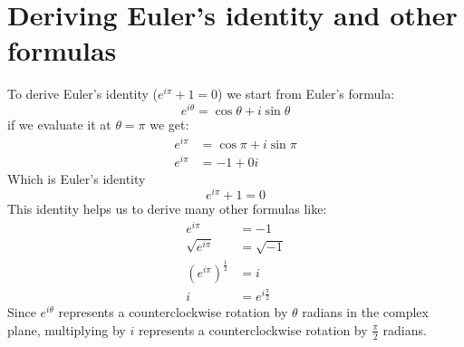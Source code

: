 \documentclass[12pt,a4paper]{article}
\begin{document}
\section{Deriving Euler's identity and other formulas}\label{app:AppendixC}
To derive Euler's identity ($e^{i\pi} + 1 = 0$) we start from Euler's formula:
\[
e^{i\theta} = \cos{\theta} + i\sin{\theta}
\]
if we evaluate it at $\theta = \pi$ we get:
\begin{align*}
e^{i\pi} &= \cos{\pi} + i\sin{\pi}\\
e^{i\pi} &= -1 + 0i
\end{align*}
Which is Euler's identity
\[
e^{i\pi} + 1 = 0
\]
This identity helps us to derive many other formulas like:
\begin{align*}
e^{i\pi} &= -1\\
\sqrt{e^{i\pi}} &= \sqrt{-1}\\
(e^{i\pi})^{\frac{1}{2}} &= i\\
i &= e^{i\frac{\pi}{2}}
\end{align*}
Since $e^{i\theta}$ represents a counterclockwise rotation by $\theta$ radians in the complex plane, multiplying by $i$ represents a counterclockwise rotation by $\frac{\pi}{2}$ radians.

\nocite{*}


\end{document}
